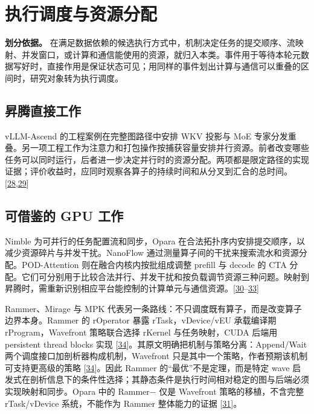 \documentclass[
  UTF8,
  zihao=5]{ctexart}
\begin{document}
\hypertarget{scheduling}{%
\section{执行调度与资源分配}\label{scheduling}}

\textbf{划分依据。}
在满足数据依赖的候选执行方式中，机制决定任务的提交顺序、流映射、并发窗口，或计算和通信能使用的资源，就归入本类。事件用于等待本轮元数据写好时，直接作用是保证状态可见；用同样的事件划出计算与通信可以重叠的区间时，研究对象转为执行调度。

\hypertarget{ux6607ux817eux76f4ux63a5ux5de5ux4f5c-3}{%
\subsection{昇腾直接工作}\label{ux6607ux817eux76f4ux63a5ux5de5ux4f5c-3}}

vLLM-Ascend 的工程案例在完整图路径中安排 WKV 投影与 MoE
专家分发重叠。另一项工程工作为注意力和打包操作按捕获容量安排并行资源。前者改变哪些任务可以同时运行，后者进一步决定并行时的资源分配。两项都是限定路径的实现证据；评价收益时，应同时观察各算子的持续时间和从分叉到汇合的总时间。{[}\protect\hyperlink{ref-ascend19716}{28},\protect\hyperlink{ref-ascend19909}{29}{]}

\hypertarget{ux53efux501fux9274ux7684-gpu-ux5de5ux4f5c-3}{%
\subsection{可借鉴的 GPU
工作}\label{ux53efux501fux9274ux7684-gpu-ux5de5ux4f5c-3}}

Nimble 为可并行的任务配置流和同步，Opara
在合法拓扑序内安排提交顺序，以减少资源碎片与并发干扰。NanoFlow
通过测量算子间的干扰来搜索流水和资源分配。POD-Attention
则在融合内核内按批组成调整 prefill 与 decode 的 CTA
分配。它们可分别用于比较合法并行、并发干扰和按负载调节资源三种问题。映射到昇腾时，需重新识别相应平台能控制的计算单元与通信资源。{[}\protect\hyperlink{ref-kwon2020nimble}{30}--\protect\hyperlink{ref-kamath2025pod}{33}{]}

Rammer、Mirage 与 MPK
代表另一条路线：不只调度既有算子，而是改变算子边界本身。Rammer 的
rOperator 暴露 rTask，vDevice/vEU 承载编译期 rProgram，Wavefront
策略联合选择 rKernel 与任务映射，CUDA 后端用 persistent thread blocks
实现
{[}\protect\hyperlink{ref-ma2020rammer}{34}{]}。其原文明确把机制与策略分离：Append/Wait
两个调度接口加剖析器构成机制，Wavefront
只是其中一个策略，作者预期该机制可支持更高级的策略
{[}\protect\hyperlink{ref-ma2020rammer}{34}{]}。因此 Rammer
的``最优''不是定理，而是特定 wave
启发式在剖析信息下的条件性选择；其静态条件是执行时间相对稳定的图与后端必须实现映射和同步。Opara
中的 Rammer− 仅是 Wavefront 策略的移植，不含完整 rTask/vDevice
系统，不能作为 Rammer 整体能力的证据
{[}\protect\hyperlink{ref-chen2025opara}{31}{]}。
\end{document}
